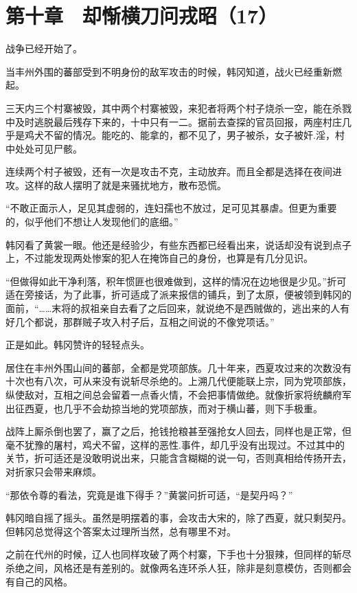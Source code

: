 \section{第十章　却惭横刀问戎昭（17）}

战争已经开始了。

当丰州外围的蕃部受到不明身份的敌军攻击的时候，韩冈知道，战火已经重新燃起。

三天内三个村寨被毁，其中两个村寨被毁，来犯者将两个村子烧杀一空，能在杀戮中及时逃脱最后残存下来的，十中只有一二。据前去查探的官员回报，两座村庄几乎是鸡犬不留的情况。能吃的、能拿的，都不见了，男子被杀，女子被奸.淫，村中处处可见尸骸。

连续两个村子被毁，还有一次是攻击不克，主动放弃。而且全都是选择在夜间进攻。这样的敌人摆明了就是来骚扰地方，散布恐慌。

“不敢正面示人，足见其虚弱的，连妇孺也不放过，足可见其暴虐。但更为重要的，似乎他们不想让人发现他们的底细。”

韩冈看了黄裳一眼。他还是经验少，有些东西都已经看出来，说话却没有说到点子上，不过能发现两处惨案的犯人在掩饰自己的身份，也算是有几分见识。

“但做得如此干净利落，积年惯匪也很难做到，这样的情况在边地很是少见。”折可适在旁接话，为了此事，折可适成了派来报信的铺兵，到了太原，便被领到韩冈的面前，“……末将的叔祖亲自去看了之后回来，就说绝不是西贼做的，逃出来的人有好几个都说，那群贼子攻入村子后，互相之间说的不像党项话。”

正是如此。韩冈赞许的轻轻点头。

居住在丰州外围山间的蕃部，全都是党项部族。几十年来，西夏攻过来的次数没有十次也有八次，可从来没有说斩尽杀绝的。上溯几代便能联上宗，同为党项部族，纵使敌对，互相之间总会留着一点香火情，不会把事情做绝。就像折家将统麟府军出征西夏，也几乎不会劫掠当地的党项部族，而对于横山蕃，则下手极重。

战阵上厮杀倒也罢了，赢了之后，抢钱抢粮甚至强抢女人回去，同样也是正常，但毫不犹豫的屠村，鸡犬不留，这样的恶性.事件，却几乎没有出现过。不过其中的关节，折可适还是没敢明说出来，只能含含糊糊的说一句，否则真相给传扬开去，对折家只会带来麻烦。

“那依令尊的看法，究竟是谁下得手？”黄裳问折可适，“是契丹吗？”

韩冈暗自摇了摇头。虽然是明摆着的事，会攻击大宋的，除了西夏，就只剩契丹。但韩冈总觉得这个答案太过理所当然，总有哪里不对。

之前在代州的时候，辽人也同样攻破了两个村寨，下手也十分狠辣，但同样的斩尽杀绝之间，风格还是有差别的。就像两名连环杀人狂，除非是刻意模仿，否则都会有自己的风格。

